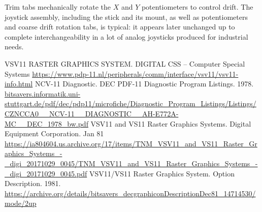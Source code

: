 \documentclass[11pt, a4paper]{article}
\begin{document}
Trim tabs mechanically rotate the $X$ and $Y$ potentiometers to control drift.
The joystick assembly, including the stick and its mount, as well as potentiometers and coarse drift rotation tabs, is typical: it appears later unchanged up to complete interchangeability in a lot of analog joysticks produced for industrial needs.


\begin{thebibliography}{9}
 VSV11 RASTER GRAPHICS SYSTEM. D\textbar I\textbar G\textbar I\textbar T\textbar A\textbar L CSS -- Computer Special Systems \url{https://www.pdp-11.nl/peripherals/comm/interface/vsv11/vsv11-info.html}
 NCV-11 Diagnostic. DEC PDF-11 Diagnostic Program Listings. 1978. \url{bitsavers.informatik.uni-stuttgart.de/pdf/dec/pdp11/microfiche/Diagnostic_Program_Listings/Listings/CZNCCA0__NCV-11__DIAGNOSTIC__AH-E772A-MC__DEC_1978_bw.pdf}
 VSV11 and VS11 Raster Graphics Systems. Digital Equipment Corporation. Jan 81 \url{https://ia804604.us.archive.org/17/items/TNM_VSV11_and_VS11_Raster_Graphics_Systems_-_digi_20171029_0045/TNM_VSV11_and_VS11_Raster_Graphics_Systems_-_digi_20171029_0045.pdf}
 VSV11/VS11 Raster Graphics System. Option Description. 1981. \url{https://archive.org/details/bitsavers_decgraphiconDescriptionDec81_14714530/mode/2up}
\end{thebibliography}
\end{document}

